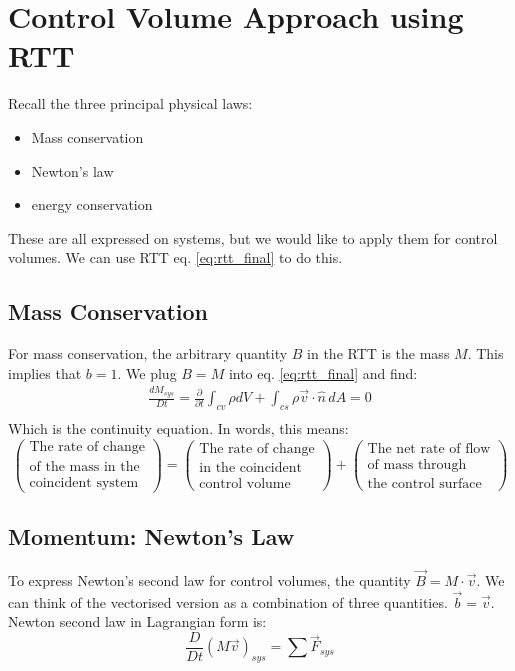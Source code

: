 \chapter{Control Volume Approach using RTT}

Recall the three principal physical laws:
\begin{itemize}
	\setlength{\itemsep}{-5pt}
	\item Mass conservation
	\item Newton's  law
	\item energy conservation
\end{itemize}
These are all expressed on systems, but we would like to apply them for control volumes. We can use RTT eq. \eqref{eq:rtt_final} to do this.

\section{Mass Conservation}
For mass conservation, the arbitrary quantity $B$ in the RTT is the mass $M$. This implies that $b=1$. We plug $B=M$ into eq. \eqref{eq:rtt_final} and find:
\begin{equation}
	\begin{split}
		\frac{dM_{sys}}{Dt} = \boxed{\frac{\partial}{\partial t}  \int_{cv} \rho dV + \int _{cs} \rho \vec v \cdot \hat n \,dA =0}\\
	\end{split}
	\label{eq:continuity}
\end{equation}
Which is the continuity equation. In words, this means:
\begin{equation*}
	\left(\substack{
		\text{The rate of change}\\
		\text{of the mass in the}\\
		\text{coincident system}
		}\right) = \left(\substack{
		\text{The rate of change}\\
		\text{in the coincident}\\
		\text{control volume}
		}\right) + \left(\substack{
		\text{The net rate of flow}\\
		\text{of mass through}\\
		\text{the control surface}
		}\right)
\end{equation*}

\section{Momentum: Newton's  Law}
To express Newton's second law for control volumes, the quantity $\vec B=M\cdot \vec v$. We can think of the vectorised version as a combination of three quantities. $\vec b = \vec v$.
Newton second law in Lagrangian form is:
\begin{equation*}
	\frac{D}{Dt}(M\vec v)_{sys} = \sum \vec F_{sys}
\end{equation*}

